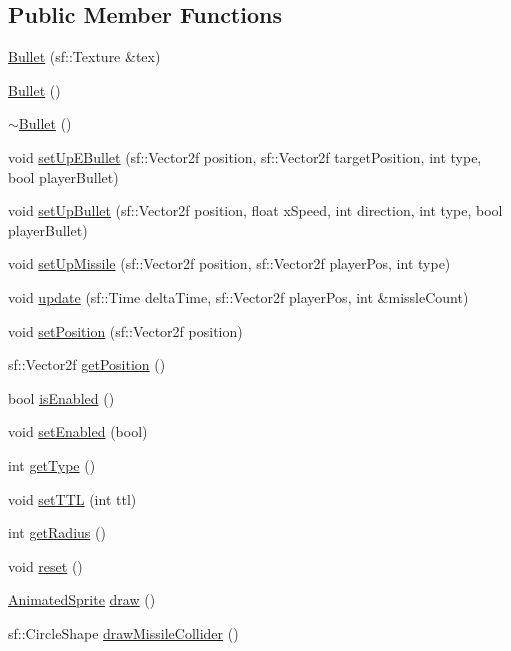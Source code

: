 \subsection*{Public Member Functions}
\begin{DoxyCompactItemize}
\item 
\hyperlink{class_bullet_aa63b471d62d662e9015d18c7c7972db0}{Bullet} (sf\+::\+Texture \&tex)
\item 
\hyperlink{class_bullet_acd7befc0bc18907cc1d871d37bbdddeb}{Bullet} ()
\item 
\hyperlink{class_bullet_aaeb5cb41d7db89f49007b08b41f1bfcf}{$\sim$\+Bullet} ()
\item 
void \hyperlink{class_bullet_afa7788ce043c909b96c37a0265755000}{set\+Up\+E\+Bullet} (sf\+::\+Vector2f position, sf\+::\+Vector2f target\+Position, int type, bool player\+Bullet)
\item 
void \hyperlink{class_bullet_a2ac1e1ac43af3bbd0d7c2a72e0e17e51}{set\+Up\+Bullet} (sf\+::\+Vector2f position, float x\+Speed, int direction, int type, bool player\+Bullet)
\item 
void \hyperlink{class_bullet_a5ee57e44e79f829920f4c117937d5f97}{set\+Up\+Missile} (sf\+::\+Vector2f position, sf\+::\+Vector2f player\+Pos, int type)
\item 
void \hyperlink{class_bullet_ac1793d563983d2503cc562e0b3e1eee7}{update} (sf\+::\+Time delta\+Time, sf\+::\+Vector2f player\+Pos, int \&missle\+Count)
\item 
void \hyperlink{class_bullet_a143a06245534960d6af5ffb10b101750}{set\+Position} (sf\+::\+Vector2f position)
\item 
sf\+::\+Vector2f \hyperlink{class_bullet_a64e4ce634f62ab31d338bd142c1987c9}{get\+Position} ()
\item 
bool \hyperlink{class_bullet_a459d9d3adb6bdd2899965e1916eafb49}{is\+Enabled} ()
\item 
void \hyperlink{class_bullet_a31f36da7eb69fdf357670f2ac7bbae85}{set\+Enabled} (bool)
\item 
int \hyperlink{class_bullet_a73634149134359bca3f2201fb6284707}{get\+Type} ()
\item 
void \hyperlink{class_bullet_abbf2bd440aade1c9f0f8f61d333ca64a}{set\+T\+TL} (int ttl)
\item 
int \hyperlink{class_bullet_a781ca8ccaf366435ece65eacd79e8b44}{get\+Radius} ()
\item 
void \hyperlink{class_bullet_af2e8a6860232266f180efbdb2a68f8c9}{reset} ()
\item 
\hyperlink{class_animated_sprite}{Animated\+Sprite} \hyperlink{class_bullet_abd80643d0485e32232ad46cc2087de40}{draw} ()
\item 
sf\+::\+Circle\+Shape \hyperlink{class_bullet_ac8c9c18e09ff7ef97313aa0c805c9846}{draw\+Missile\+Collider} ()
\end{DoxyCompactItemize}


